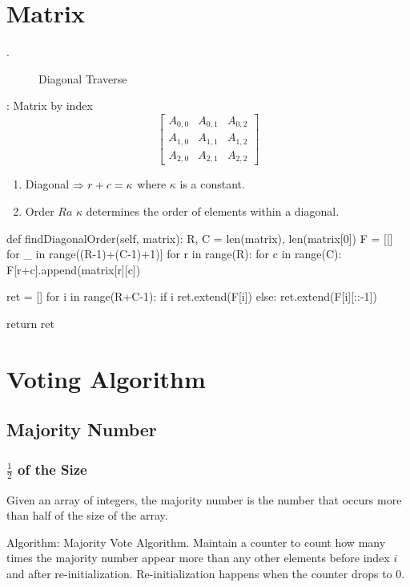 \section{Matrix}
. 
\begin{figure}[hbtp]
\centering
{}
\caption{Diagonal Traverse}
\label{fig:diag1-grid}
\end{figure}
:
Matrix by index
$$
\left[\begin{array}{ccc}
A_{0,0} & A_{0,1} & A_{0,2} \\
A_{1,0} & A_{1,1} & A_{1,2} \\
A_{2,0} & A_{2,1} & A_{2,2}
\end{array}\right]
$$
\begin{enumerate}
\item Diagonal $\Rightarrow r + c = \kappa$ where $\kappa$ is a constant. 
\item Order $Ra$ $\kappa$ determines the order of elements within a diagonal.
\end{enumerate}
\begin{python}
def findDiagonalOrder(self, matrix):
    R, C = len(matrix), len(matrix[0])
    F = [[] for _ in range((R-1)+(C-1)+1)]
    for r in range(R):
        for c in range(C):
            F[r+c].append(matrix[r][c])

    ret = []
    for i in range(R+C-1):
        if i %
            ret.extend(F[i])
        else:
            ret.extend(F[i][::-1])

    return ret
\end{python}
\section{Voting Algorithm}
\subsection{Majority Number}
\subsubsection{$\frac{1}{2}$ of the Size}
Given an array of integers, the majority number is the number that occurs more than half of the size of the array. 

Algorithm: Majority Vote Algorithm. Maintain a counter to count how many times the majority number appear more than any other elements before index $i$ and after re-initialization. Re-initialization happens when the counter drops to 0. 


